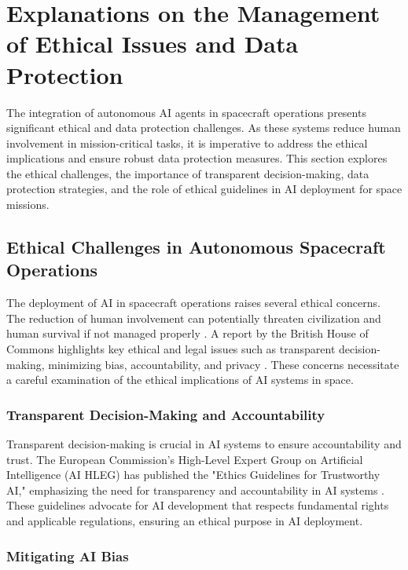 \documentclass[a4paper, 11pt]{article}
\begin{document}
\section{Explanations on the Management of Ethical Issues and Data Protection}

The integration of autonomous AI agents in spacecraft operations presents significant ethical and data protection challenges. As these systems reduce human involvement in mission-critical tasks, it is imperative to address the ethical implications and ensure robust data protection measures. This section explores the ethical challenges, the importance of transparent decision-making, data protection strategies, and the role of ethical guidelines in AI deployment for space missions.

\subsection{Ethical Challenges in Autonomous Spacecraft Operations}

The deployment of AI in spacecraft operations raises several ethical concerns. The reduction of human involvement can potentially threaten civilization and human survival if not managed properly \cite{343}. A report by the British House of Commons highlights key ethical and legal issues such as transparent decision-making, minimizing bias, accountability, and privacy \cite{325}. These concerns necessitate a careful examination of the ethical implications of AI systems in space.

\subsubsection{Transparent Decision-Making and Accountability}

Transparent decision-making is crucial in AI systems to ensure accountability and trust. The European Commission's High-Level Expert Group on Artificial Intelligence (AI HLEG) has published the "Ethics Guidelines for Trustworthy AI," emphasizing the need for transparency and accountability in AI systems \cite{344}. These guidelines advocate for AI development that respects fundamental rights and applicable regulations, ensuring an ethical purpose in AI deployment.

\subsubsection{Mitigating AI Bias}
\end{document}

